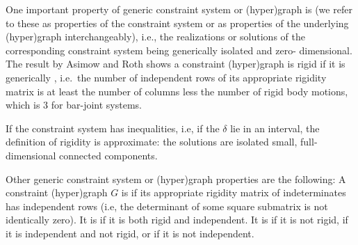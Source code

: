 
One important property of generic constraint system or (hyper)graph
is  (\note we refer to these as properties of
the constraint system or as properties of the underlying (hyper)graph
interchangeably), i.e., the realizations or solutions of the
corresponding constraint system being generically isolated and zero-
dimensional.%
The result by Asimow and Roth \uncited shows a constraint
(hyper)graph is rigid if it is generically , i.e.\ the number of independent rows of its appropriate
rigidity matrix is at least the number of columns less the number of
rigid body motions, which is 3 for bar-joint systems.

\noindent
\note If the constraint system has inequalities, i.e, if the $\delta$
lie in an interval, the definition of rigidity is approximate: the
solutions are isolated small, full-dimensional  connected components.

Other generic constraint system or (hyper)graph properties are the
following:
A constraint (hyper)graph $G$ is  if its appropriate
rigidity matrix of indeterminates has independent rows (i.e, the
determinant of some square submatrix is not identically zero).
It is  if it is
both rigid and independent.
It is  if it is not rigid,  if it
is independent and not rigid, or  if it is not
independent.


